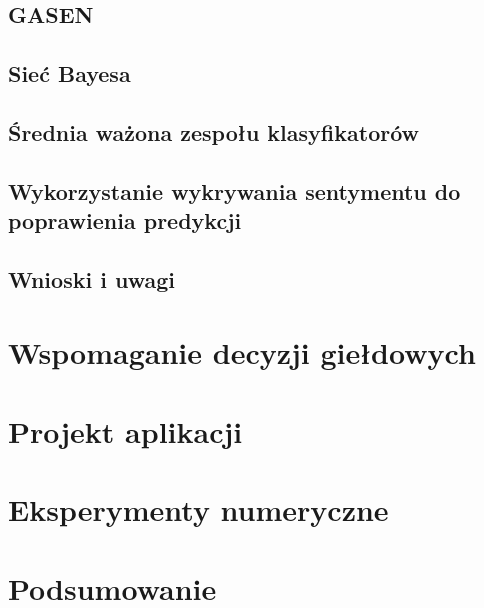 \documentclass[a4paper, twoside, 11pt, openright]{article}
\begin{document}
\subsection{GASEN}

\subsection{Sieć Bayesa}

\subsection{Średnia ważona zespołu klasyfikatorów}

\subsection{Wykorzystanie wykrywania sentymentu do poprawienia predykcji}

\subsection{Wnioski i uwagi}

\newpage

\section{Wspomaganie decyzji giełdowych}

\newpage

\section{Projekt aplikacji}

\newpage

\section{Eksperymenty numeryczne}

\newpage

\section{Podsumowanie}


\newpage
\end{document}
